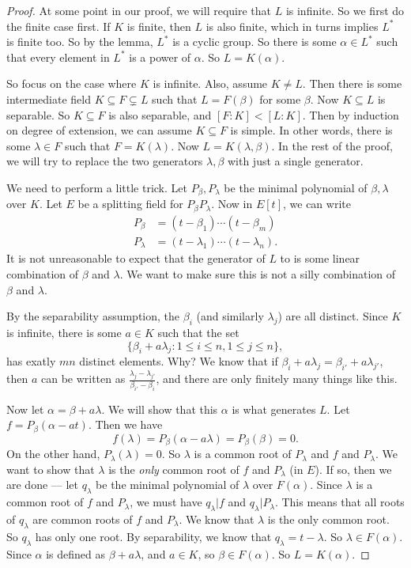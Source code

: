 \documentclass[a4paper]{article}
\begin{document}
\begin{proof}
  At some point in our proof, we will require that $L$ is infinite. So we first do the finite case first. If $K$ is finite, then $L$ is also finite, which in turns implies $L^*$ is finite too. So by the lemma, $L^*$ is a cyclic group. So there is some $\alpha \in L^*$ such that every element in $L^*$ is a power of $\alpha$. So $L = K(\alpha)$.

  So focus on the case where $K$ is infinite. Also, assume $K \not= L$. Then there is some intermediate field $K\subseteq F\subsetneq L$ such that $L = F(\beta)$ for some $\beta$. Now $K\subseteq L$ is separable. So $K\subseteq F$ is also separable, and $[F:K] < [L:K]$. Then by induction on degree of extension, we can assume $K\subseteq F$ is simple. In other words, there is some $\lambda \in F$ such that $F = K(\lambda)$. Now $L = K(\lambda, \beta)$. In the rest of the proof, we will try to replace the two generators $\lambda, \beta$ with just a single generator.

  We need to perform a little trick. Let $P_\beta, P_\lambda$ be the minimal polynomial of $\beta, \lambda$ over $K$. Let $E$ be a splitting field for $P_\beta P_\lambda$. Now in $E[t]$, we can write
  \begin{align*}
    P_\beta &= (t - \beta_1)\cdots (t - \beta_m)\\
    P_\lambda &= (t - \lambda_1) \cdots (t - \lambda_n).
  \end{align*}
  It is not unreasonable to expect that the generator of $L$ to is some linear combination of $\beta$ and $\lambda$. We want to make sure this is not a silly combination of $\beta$ and $\lambda$.

  By the separability assumption, the $\beta_i$ (and similarly $\lambda_j$) are all distinct. Since $K$ is infinite, there is some $a \in K$ such that the set
  \[
    \{\beta_i + a \lambda_j: 1 \leq i \leq n, 1 \leq j \leq n\},
  \]
  has exatly $mn$ distinct elements. Why? We know that if $\beta_i + a \lambda_j = \beta_{i'} + a \lambda_{j'}$, then $a$ can be written as $\frac{\lambda_j - \lambda_{j'}}{\beta_{i'} - \beta_i}$, and there are only finitely many things like this.

  Now let $\alpha = \beta + a \lambda$. We will show that this $\alpha$ is what generates $L$. Let $f = P_\beta(\alpha - at)$. Then we have
  \[
    f(\lambda) = P_\beta(\alpha - a\lambda) = P_\beta(\beta) = 0.
  \]
  On the other hand, $P_\lambda(\lambda) = 0$. So $\lambda$ is a common root of $P_\lambda$ and $f$ and $P_\lambda$. We want to show that $\lambda$ is the \emph{only} common root of $f$ and $P_\lambda$ (in $E$). If so, then we are done --- let $q_\lambda$ be the minimal polynomial of $\lambda$ over $F(\alpha)$. Since $\lambda$ is a common root of $f$ and $P_\lambda$, we must have $q_\lambda | f$ and $q_\lambda | P_\lambda$. This means that all roots of $q_\lambda$ are common roots of $f$ and $P_\lambda$. We know that $\lambda$ is the only common root. So $q_\lambda$ has only one root. By separability, we know that $q_\lambda = t - \lambda$. So $\lambda \in F(\alpha)$. Since $\alpha$ is defined as $\beta + a \lambda$, and $a \in K$, so $\beta\in F(\alpha)$. So $L = K(\alpha)$.


\end{proof}
\end{document}
